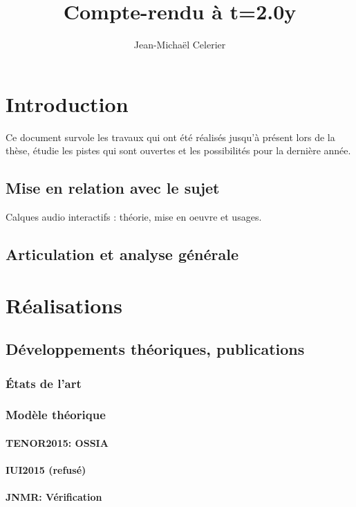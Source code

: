 \documentclass[french,a4paper]{book}
\title{Compte-rendu à t=2.0y}
\author{Jean-Michaël Celerier}
\begin{document}
\maketitle

\tableofcontents

\chapter{Introduction}
Ce document survole les travaux qui ont été réalisés jusqu'à présent 
lors de la thèse, étudie les pistes qui sont ouvertes et les possibilités 
pour la dernière année.

\section{Mise en relation avec le sujet}
Calques audio interactifs : théorie, mise en oeuvre et usages.

\section{Articulation et analyse générale}
\chapter{Réalisations}

\section{Développements théoriques, publications}
\subsection{États de l'art}

\subsection{Modèle théorique}
\subsubsection{TENOR2015: OSSIA}
\subsubsection{IUI2015 (refusé)}
\subsubsection{JNMR: Vérification}
\end{document}
